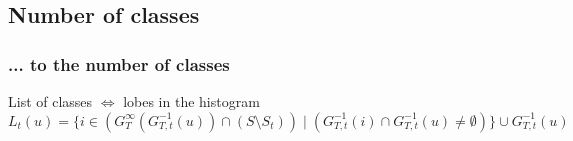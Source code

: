 	\subsection[Number of lobes]{Number of classes}
		\begin{frame}
			\frametitle{... to the number of classes}
			\begin{block}{List of classes $\Leftrightarrow$ lobes in the histogram}
				\begin{equation}
			 	  	L_t(u) = \Big\{ i \in \left( G_T^{\infty}(G_{T,t}^{-1} (u)) \cap ( S \setminus S_t ) \right) \;|\; \left( G_{T,t}^{-1} (i) \cap G_{T,t}^{-1} (u) \neq \emptyset \right) \Big\} \cup  G_{T,t}^{-1}(u)
				\end{equation}
			\end{block}			


\end{frame}
